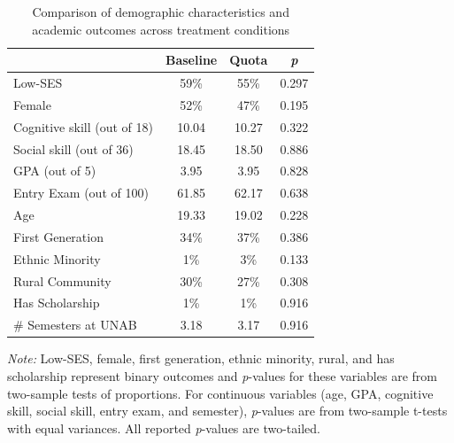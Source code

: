 \documentclass[11pt,a4paper,oneside]{article}
\begin{document}
\begin{table}[H]
\centering
\begin{threeparttable}
\caption{Comparison of demographic characteristics and academic outcomes across treatment conditions}
\begin{tabular*}{0.85\textwidth}{@{\extracolsep{\fill}}lcc c@{}}
\toprule
 & \multicolumn{1}{c}{\textbf{Baseline}} & \multicolumn{1}{c}{\textbf{Quota}} & \multicolumn{1}{c}{\textit{\textbf{p}}} \\ \midrule
Low-SES & 59\% & 55\% & \multicolumn{1}{c}{0.297} \\
Female & 52\% & 47\% & \multicolumn{1}{c}{0.195} \\
Cognitive skill (out of 18) & 10.04 & 10.27 & \multicolumn{1}{c}{0.322} \\
Social skill (out of 36) & 18.45 & 18.50 & \multicolumn{1}{c}{0.886} \\
GPA (out of 5) & 3.95 & 3.95 & \multicolumn{1}{c}{0.828} \\
Entry Exam (out of 100) & 61.85 & 62.17 & \multicolumn{1}{c}{0.638} \\
Age & 19.33 & 19.02 & \multicolumn{1}{c}{0.228} \\
First Generation & 34\% & 37\% & \multicolumn{1}{c}{0.386} \\
Ethnic Minority & 1\% & 3\% & \multicolumn{1}{c}{0.133} \\
Rural Community & 30\% & 27\% & \multicolumn{1}{c}{0.308} \\
Has Scholarship & 1\% & 1\% & \multicolumn{1}{c}{0.916} \\
\# Semesters at UNAB & 3.18 & 3.17 & \multicolumn{1}{c}{0.916} \\
\bottomrule
\end{tabular*}
\begin{tablenotes}[flushleft]
\footnotesize
\item[] \textit{Note:} Low-SES, female, first generation, ethnic minority, rural, and has scholarship represent binary outcomes and \textit{p}-values for these variables are from two-sample tests of proportions. For continuous variables (age, GPA, cognitive skill, social skill, entry exam, and semester), \textit{p}-values are from two-sample t-tests with equal variances. All reported \textit{p}-values are two-tailed.
\end{tablenotes}
\label{tab:demographic-comparison}
\end{threeparttable}
\end{table}
\end{document}
